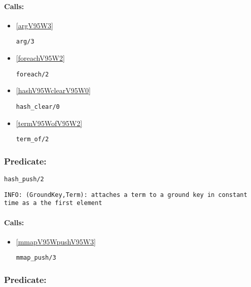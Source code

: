 \paragraph{Calls:} 
\begin{itemize}
\item \ref{argV95W3} 
\begin{verbatim}
arg/3
\end{verbatim}

\item \ref{foreachV95W2} 
\begin{verbatim}
foreach/2
\end{verbatim}

\item \ref{hashV95WclearV95W0} 
\begin{verbatim}
hash_clear/0
\end{verbatim}

\item \ref{termV95WofV95W2} 
\begin{verbatim}
term_of/2
\end{verbatim}

\end{itemize}

\subsubsection{Predicate:} \label{hashV95WpushV95W2}

\begin{verbatim}
hash_push/2
\end{verbatim}

{\small \begin{verbatim}
INFO: (GroundKey,Term): attaches a term to a ground key in constant time as a the first element

\end{verbatim}}
\paragraph{Calls:} 
\begin{itemize}
\item \ref{mmapV95WpushV95W3} 
\begin{verbatim}
mmap_push/3
\end{verbatim}

\end{itemize}

\subsubsection{Predicate:} \label{hashV95WputV95W2}

